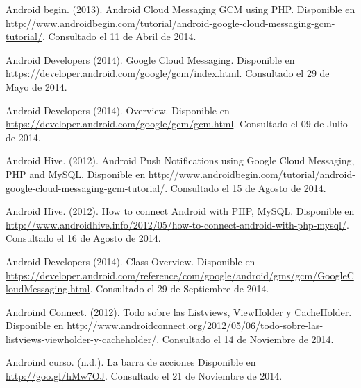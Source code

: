 \begin{spacing}{1.0}
\begin{thebibliography}{99}  

\newblock Android begin. (2013).
\newblock Android Cloud Messaging GCM using PHP. 
\newblock Disponible en \url{http://www.androidbegin.com/tutorial/android-google-cloud-messaging-gcm-tutorial/}.
\newblock Consultado el 11 de Abril de 2014.

\newblock Android Developers (2014).
\newblock Google Cloud Messaging.
\newblock Disponible en \url{https://developer.android.com/google/gcm/index.html}.
\newblock Consultado el 29 de Mayo de 2014.

\newblock Android Developers (2014).
\newblock Overview.
\newblock Disponible en \url{https://developer.android.com/google/gcm/gcm.html}.
\newblock Consultado el 09 de Julio de 2014.

\newblock Android Hive. (2012).
\newblock Android Push Notifications using Google Cloud Messaging, PHP and MySQL. 
\newblock Disponible en \url{http://www.androidbegin.com/tutorial/android-google-cloud-messaging-gcm-tutorial/}.
\newblock Consultado el 15 de Agosto de 2014.

\newblock Android Hive. (2012).
\newblock How to connect Android with PHP, MySQL. 
\newblock Disponible en \url{http://www.androidhive.info/2012/05/how-to-connect-android-with-php-mysql/}.
\newblock Consultado el 16 de Agosto de 2014.


\newblock Android Developers (2014).
\newblock Class Overview.
\newblock Disponible en \url{https://developer.android.com/reference/com/google/android/gms/gcm/GoogleCloudMessaging.html}.
\newblock Consultado el 29 de Septiembre de 2014.

\newblock Androind Connect. (2012).
\newblock Todo sobre las Listviews, ViewHolder y CacheHolder.
\newblock Disponible en \url{http://www.androidconnect.org/2012/05/06/todo-sobre-las-listviews-viewholder-y-cacheholder/}.
\newblock Consultado el 14 de Noviembre de 2014.

\newblock Androind curso. (n.d.).
\newblock La barra de acciones
\newblock Disponible en \url{http://goo.gl/hMw7OJ}.
\newblock Consultado el 21 de Noviembre de 2014.


\end{thebibliography}
\end{spacing}
